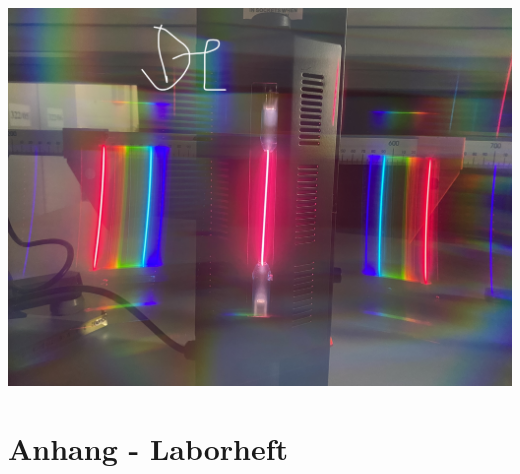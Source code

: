 \documentclass[12pt,oneside,oldfontcommands]{memoir}
\begin{document}
\includegraphics[width=.96\columnwidth]{figures/IMG_5303.jpg}
\section{Anhang - Laborheft}

       
\end{document}
